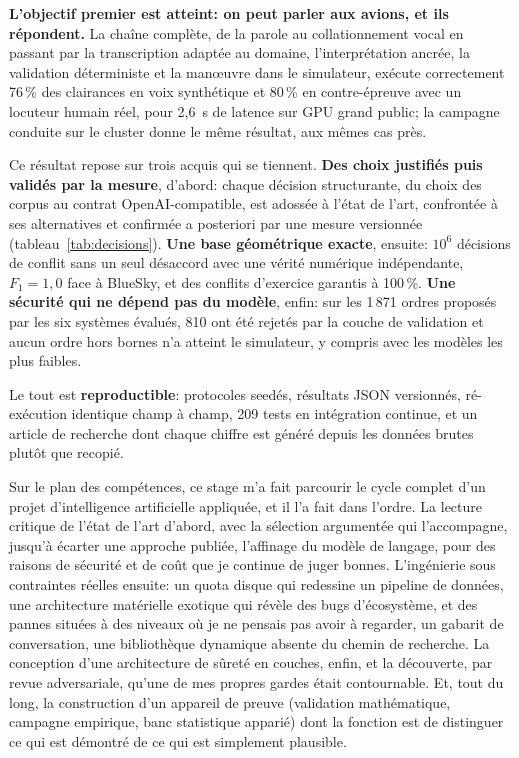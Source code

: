 \documentclass[11pt,a4paper]{article}
\begin{document}
\begin{resbox}
\textbf{L'objectif premier est atteint: on peut parler aux avions, et ils répondent.} La
chaîne complète, de la parole au collationnement vocal en passant par la transcription
adaptée au domaine, l'interprétation ancrée, la validation déterministe et la man\oe uvre
dans le simulateur, exécute correctement 76\,\% des clairances en voix synthétique et
80\,\% en contre-épreuve avec un locuteur humain réel, pour 2,6~s de latence sur GPU grand
public; la campagne conduite sur le cluster donne le même résultat, aux mêmes cas près.

Ce résultat repose sur trois acquis qui se tiennent. \textbf{Des choix justifiés puis
validés par la mesure}, d'abord: chaque décision structurante, du choix des corpus au
contrat OpenAI-compatible, est adossée à l'état de l'art, confrontée à ses alternatives et
confirmée a posteriori par une mesure versionnée (tableau~\ref{tab:decisions}).
\textbf{Une base géométrique exacte}, ensuite: $10^6$ décisions de conflit sans un seul
désaccord avec une vérité numérique indépendante, $F_1 = 1{,}0$ face à BlueSky, et des
conflits d'exercice garantis à 100\,\%. \textbf{Une sécurité qui ne dépend pas du modèle},
enfin: sur les 1\,871 ordres proposés par les six systèmes évalués, 810 ont été rejetés
par la couche de validation et aucun ordre hors bornes n'a atteint le simulateur, y
compris avec les modèles les plus faibles.

Le tout est \textbf{reproductible}: protocoles seedés, résultats JSON versionnés,
ré-exécution identique champ à champ, 209 tests en intégration continue, et un article de
recherche dont chaque chiffre est généré depuis les données brutes plutôt que recopié.
\end{resbox}

Sur le plan des compétences, ce stage m'a fait parcourir le cycle complet d'un projet d'intelligence artificielle appliquée, et il l'a fait dans l'ordre. La lecture critique de l'état de l'art d'abord, avec la sélection argumentée qui l'accompagne, jusqu'à écarter une approche publiée, l'affinage du modèle de langage, pour des raisons de sécurité et de coût que je continue de juger bonnes. L'ingénierie sous contraintes réelles ensuite: un quota disque qui redessine un pipeline de données, une architecture matérielle exotique qui révèle des bugs d'écosystème, et des pannes situées à des niveaux où je ne pensais pas avoir à regarder, un gabarit de conversation, une bibliothèque dynamique absente du chemin de recherche. La conception d'une architecture de sûreté en couches, enfin, et la découverte, par revue adversariale, qu'une de mes propres gardes était contournable. Et, tout du long, la construction d'un appareil de preuve (validation mathématique, campagne empirique, banc statistique apparié) dont la fonction est de distinguer ce qui est démontré de ce qui est simplement plausible. 
\end{document}
